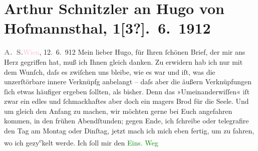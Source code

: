 

               \section[Arthur Schnitzler an Hugo von Hofmannsthal, 1{[}3?{]}. 6. 1912]{ Arthur Schnitzler an Hugo von Hofmannsthal, 1{[}3?{]}. 6. 1912}\nopagebreak{}\rehead{ }\normalsize\beginnumbering{} \toendnotes[C]{\smallbreak\pagebreak[2]} 
\toendnotes[C]{\smallbreak}\pstart
           {\pb}\textcolor{gray}{\textbf{A. S.}}\hfill \textcolor{pink}{Wien}{}\ledrightnote{\textcolor{pink}{Wien}}, 12. 6. 912\pend
           \pstart
           Mein lieber Hugo, für Ihren ſchönen Brief, der mir ans Herz
               gegriffen hat, muß ich Ihnen gleich danken. Zu erwidern hab ich nur mit dem Wunſch,
               daſs es zwiſchen uns bleibe, wie es war und iſt, was die unzerſtörbare innere
               Verknüpfg anbelangt – daſs aber die äußern Verknüpfungen ſich etwas {\pb}häufiger ergeben ſollten, als bisher. Denn das
               »Umeinanderwiſſen« iſt zwar ein edles und ſchmackhaftes aber doch ein magers Brod für
               die Seele. Und um gleich den Anfang zu machen, wir möchten gerne \label{K_L02075_1v}\label{K_L02075_1h} bei Euch angefahren kommen, in den frühen Abendſtunden; gegen Ende, ich
               ſchreibe oder telegrafire den Tag \introOben{}am\introOben{} Montag oder Dinſtag,
                  {\pb}jetzt mach ich mich eben fertig, um \label{K_L02075_2v}\label{K_L02075_2h} zu fahren, wo ich gezy\substVorne{}\textsuperscript{c}\substDazwischen{}k\substHinten{}elt werde. Ich ſoll mir den \textcolor{green}{Eins. Weg}{}\ledrightnote{\textcolor{green}{Der einsame Weg. Schauspiel in fünf Akten}}
